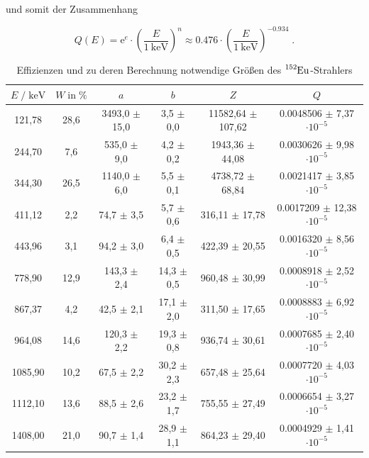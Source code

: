 und somit der Zusammenhang

\begin{equation}
  \label{eqn:eff}
  Q(E) = \text{e}^e \cdot \left(\frac{E}{\SI{1}{\kilo\eV}}\right)^n 
  \approx \num{0.476} \cdot \left(\frac{E}{\SI{1}{\kilo\eV}}\right)^{\num{-0.934}} \; .
\end{equation}

\begin{table}
  \small
  \centering
  \caption{Effizienzen und zu deren Berechnung notwendige Größen des $\ce{^{152}Eu}$-Strahlers}
  \label{tab:mess2}
  \begin{tabular}{c c c c c c}
  \toprule
  $E \;/\; \si{\kilo\eV}$ & $W \;\text{in}\; \si{\percent}$ & $a$ & $b$ & $Z$ & $Q$ \\
  \midrule
        121,78 & 28,6 & 3493,0 $\pm$ 15,0 &  3,5 $\pm$ 0,0 & 11582,64 $\pm$ 107,62 & 0.0048506 $\pm$  7,37 $\cdot 10^{-5}$ \\
        244,70 &  7,6 &  535,0 $\pm$  9,0 &  4,2 $\pm$ 0,2 &  1943,36 $\pm$  44,08 & 0.0030626 $\pm$  9,98 $\cdot 10^{-5}$ \\
        344,30 & 26,5 & 1140,0 $\pm$  6,0 &  5,5 $\pm$ 0,1 &  4738,72 $\pm$  68,84 & 0.0021417 $\pm$  3,85 $\cdot 10^{-5}$ \\
        411,12 &  2,2 &   74,7 $\pm$  3,5 &  5,7 $\pm$ 0,6 &   316,11 $\pm$  17,78 & 0.0017209 $\pm$ 12,38 $\cdot 10^{-5}$ \\
        443,96 &  3,1 &   94,2 $\pm$  3,0 &  6,4 $\pm$ 0,5 &   422,39 $\pm$  20,55 & 0.0016320 $\pm$  8,56 $\cdot 10^{-5}$ \\
        778,90 & 12,9 &  143,3 $\pm$  2,4 & 14,3 $\pm$ 0,5 &   960,48 $\pm$  30,99 & 0.0008918 $\pm$  2,52 $\cdot 10^{-5}$ \\
        867,37 &  4,2 &   42,5 $\pm$  2,1 & 17,1 $\pm$ 2,0 &   311,50 $\pm$  17,65 & 0.0008883 $\pm$  6,92 $\cdot 10^{-5}$ \\
        964,08 & 14,6 &  120,3 $\pm$  2,2 & 19,3 $\pm$ 0,8 &   936,74 $\pm$  30,61 & 0.0007685 $\pm$  2,40 $\cdot 10^{-5}$ \\
       1085,90 & 10,2 &   67,5 $\pm$  2,2 & 30,2 $\pm$ 2,3 &   657,48 $\pm$  25,64 & 0.0007720 $\pm$  4,03 $\cdot 10^{-5}$ \\
       1112,10 & 13,6 &   88,5 $\pm$  2,6 & 23,2 $\pm$ 1,7 &   755,55 $\pm$  27,49 & 0.0006654 $\pm$  3,27 $\cdot 10^{-5}$ \\
       1408,00 & 21,0 &   90,7 $\pm$  1,4 & 28,9 $\pm$ 1,1 &   864,23 $\pm$  29,40 & 0.0004929 $\pm$  1,41 $\cdot 10^{-5}$ \\
  \bottomrule
  \end{tabular}
  \end{table}


